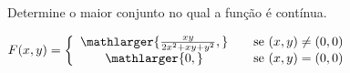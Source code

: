 
Determine o maior conjunto no qual a função é contínua.

\item $ F(x,y)=\left\{ 
				\begin{array}{cc}
					\mathlarger{\frac{xy}{2x^2+xy+y^2},} & \quad \textnormal{se } (x,y)\neq(0,0)\\
					\mathlarger{0,} & \quad \textnormal{se } (x,y) = (0,0)\\
				\end{array}
				\right.$
